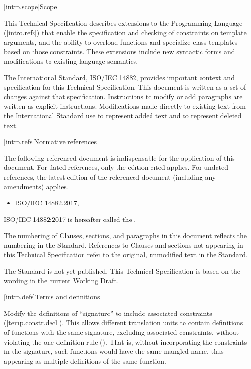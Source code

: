 
[intro.scope]{Scope}

\pnum
This Technical Specification describes extensions to the \Cpp
Programming Language (\ref{intro.refs}) that
enable the specification and checking of constraints on template 
arguments, and the ability to overload functions and specialize
class templates based on those constraints. These extensions include 
new syntactic forms and modifications to existing language semantics.

\pnum
The International Standard, ISO/IEC 14882, provides important context
and specification for this Technical Specification. This document is 
written as a set of changes against that specification. Instructions
to modify or add paragraphs are written as explicit instructions. 
Modifications made directly to existing text from the International
Standard use  to represent added text and
 to represent deleted text.


[intro.refs]{Normative references}

\pnum
The following referenced document is indispensable for the
application of this document. For dated references, only the
edition cited applies. For undated references, the latest edition
of the referenced document (including any amendments) applies.

\begin{itemize}
\item ISO/IEC 14882:2017, 
\end{itemize}

ISO/IEC 14882:2017 is hereafter called the .

The numbering of Clauses, sections, and paragraphs in this document
reflects the numbering in the \Cpp Standard. References to Clauses
and sections not appearing in this Technical Specification refer to
the original, unmodified text in the \Cpp Standard.

\enternote
The \Cpp Standard is not yet published. This Technical Specification is based
on the wording in the current Working Draft.
\exitnote


[intro.defs]{Terms and definitions}

Modify the definitions of ``signature'' to include associated
constraints (\ref{temp.constr.decl}). This allows different translation units
to contain definitions of functions with the same signature, excluding 
associated constraints, without violating the one definition rule 
(). That is, without incorporating the constraints
in the signature, such functions would have the same mangled name, thus
appearing as multiple definitions of the same function.

